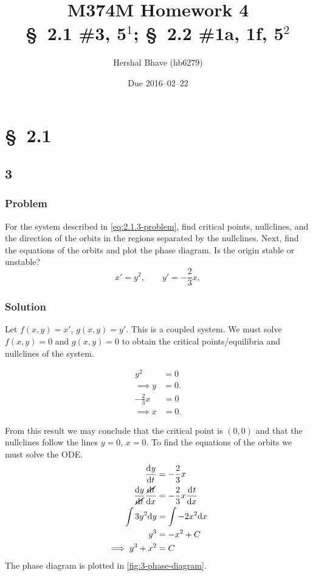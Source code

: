 \documentclass[12pt]{article}
\title{M374M Homework 4 \\
  \normalsize{\S~2.1 \#3, 5$^1$; \S~2.2 \#1a, 1f, 5$^2$}}
\author{Hershal Bhave (hb6279)}
\date{Due 2016--02--22}
\begin{document}
\maketitle
\section{\S~2.1}
\subsection{3}
\subsubsection*{Problem}
For the system described in \cref{eq:2.1.3-problem}, find critical points,
nullclines, and the direction of the orbits in the regions separated by the
nullclines. Next, find the equations of the orbits and plot the phase diagram.
Is the origin stable or unstable?
\begin{equation}
  \label{eq:2.1.3-problem}
  x'=y^2, \qquad y'=-\frac{2}{3}x,
\end{equation}
\subsubsection*{Solution}
Let $f(x,y) = x'$, $g(x,y) = y'$. This is a coupled system. We must solve
$f(x,y)=0$ and $g(x,y)=0$ to obtain the critical points/equilibria and
nullclines of the system.
\begin{multicols}{2}
  \begin{equation*}
    \begin{aligned}
      y^2 &= 0 \\
      \implies y &= 0.
    \end{aligned}
  \end{equation*}
  \begin{equation*}
    \begin{aligned}
      -\frac{2}{3}x &= 0 \\
      \implies x &= 0.
    \end{aligned}
  \end{equation*}
\end{multicols} \noindent
From this result we may conclude that the critical point is $(0,0)$ and that the
nullclines follow the lines $y=0$, $x=0$. To find the equations of the orbits we
must solve the ODE.
\begin{equation}
  \begin{aligned}
    \frac{\mathrm{d}^{} {y}}{\mathrm{d}{t}^{}} &= -\frac{2}{3}x \\
    \frac{\mathrm{d}{y}}{\cancel{\mathrm{d}{t}}} \frac{\cancel{\mathrm{d}{t}}}{\mathrm{d}{x}} &=
    -\frac{2}{3}x \frac{\mathrm{d}^{} {t}}{\mathrm{d}{x}^{}} \\
    \int 3y^2 \mathrm{d}{y} &= \int -2x^2 \mathrm{d}{x} \\
    y^3 &= -x^2 + C \\
    \implies y^3 + x^2 &= C
  \end{aligned}
\end{equation}
The phase diagram is plotted in \cref{fig:3-phase-diagram}.
\end{document}
